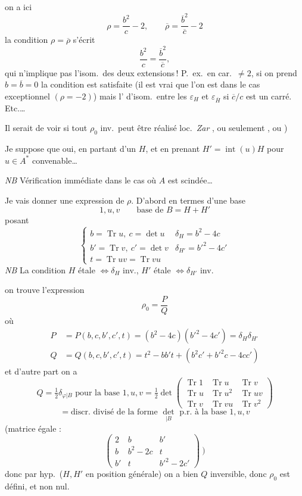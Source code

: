 \documentclass[11pt,a4paper]{article}
\begin{document}
on a ici
\[
\rho=\frac{b^{2}}{c}-2,\qquad \overline{\rho}=\frac{\overline{b}^{2}}{\overline{c}}-2
\]
la condition $\rho=\overline{\rho}$ s'écrit
\[
\frac{b^{2}}{c}=\frac{\overline{b}^{2}}{\overline{c}},
\]
qui n'implique pas l'isom.\ des deux extensions\,! P.\ ex.\ en car.\ $\neq 2$, si on prend $b=\overline{b}=0$ la condition est satisfaite  (il est vrai que l'on est dans le cas exceptionnel $(\rho=-2)$) mais l' d'isom.\ entre les  $\varepsilon_{H}$ et $\varepsilon_{\overline{H}}$ \ill{} si $\overline{c}/c$ est un carré. \struck{\ill{}} Etc.…

Il serait  de voir si tout $\rho_{0}$ inv.\ peut être réalisé loc.\ \emph{Zar} , ou seulement \ill{}, ou )

Je suppose que oui, en partant d'un $H$, et en prenant $H'=\operatorname{int}(u)H$ pour $u\in A^{*}$ convenable…

\emph{NB} Vérification immédiate dans le cas où $A$ est scindée…

Je vais donner une expression de $\rho$. D'abord en termes d'une base
\[
1,u,v \qquad\text{base de } B=H+H'
\]
posant
\[
\begin{cases}
b=\operatorname{Tr}u,\ c=\det u & \delta_{H}=b^{2}-4c\\
b'=\operatorname{Tr}v,\ c'=\det v & \delta_{H'}=b'^{2}-4c'\\
t=\operatorname{Tr}uv=\operatorname{Tr}vu
\end{cases}
\]
\emph{NB} La condition $H$ étale $\Leftrightarrow\delta_{H}$ inv., $H'$ étale $\Leftrightarrow\delta_{H'}$ inv.

on trouve l'expression
\[
\boxed{\rho_{0}=\frac{P}{Q}}
\]
où
\[
\begin{aligned}
P&=P(b,c,b',c',t)=(b^{2}-4c)(b'^{2}-4c')=\delta_{H}\delta_{H'}\\
Q&=Q(b,c,b',c',t)=t^{2}-bb't+(b^{2}c'+b'^{2}c-4cc')
\end{aligned}
\]
et d'autre part on a
\[
Q=\tfrac{1}{2}\delta_{\varphi|B} \text{ pour la base } 1,u,v
=\tfrac{1}{2}\det\begin{pmatrix}\operatorname{Tr}1&\operatorname{Tr}u&\operatorname{Tr}v\\ \operatorname{Tr}u&\operatorname{Tr}u^{2}&\operatorname{Tr}uv\\ \operatorname{Tr}v&\operatorname{Tr}vu&\operatorname{Tr}v^{2}\end{pmatrix}
\]
\[
=\text{discr.\ divisé de la forme } \det_{|B} \text{ p.r.\ à la base } 1,u,v
\]
(matrice  égale :
\[
\begin{pmatrix}2&b&b'\\ b&b^{2}-2c&t\\ b'&t&b'^{2}-2c'\end{pmatrix}\ )
\]
donc par hyp.\ ($H,H'$ en position générale)  on a bien $Q$ inversible, donc $\rho_{0}$ est défini, et non nul.
\end{document}
